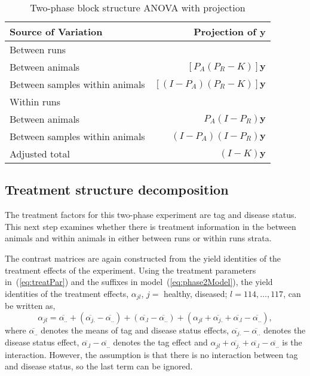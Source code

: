 \documentclass[article]{jss}
\begin{document}
\begin{table}[ht]
\centering
\caption{Two-phase block structure ANOVA with projection} 
\begin{tabular}[t]{lr}
\hline
\multicolumn{1}{l}{Source of Variation}  & \multicolumn{1}{r}{Projection of $\bm{y}$}\\
\hline
Between runs 					& \\
\hspace{3mm}Between animals & $[P_{A}(P_R - K)]\bm{y}$ 	\\
\hspace{3mm}Between samples within animals		& $[(I - P_{A})(P_R - K)]\bm{y}$ \\
\hline
Within runs 					& \\
\hspace{3mm}Between animals & $P_{A}(I-P_R)\bm{y}$\\
\hspace{3mm}Between samples within animals		&$(I - P_{A})(I-P_R)\bm{y}$ \\
\hline
Adjusted total  				&$(I-K)\bm{y}$  \\
\hline
\end{tabular}
\label{tab:block1Projection}
\end{table}

\subsection{Treatment structure decomposition}{\label{subsec:trtDecomp}}
The treatment factors for this two-phase experiment are tag and disease status. This next step examines whether there is treatment information in the between animals and within animals in either between runs or within runs strata.

The contrast matrices are again constructed from the yield identities of the treatment effects of the experiment. Using the treatment parameters in~(\ref{eq:treatPar}) and the suffixes in model~(\ref{eq:phase2Model}), the yield identities of the treatment effects, $\alpha_{jl}$, $j=$ healthy, diseased; $l = 114,\dots, 117$, can be written as,
\[
\alpha_{jl} = \overline{\alpha_{..}}+(\overline{\alpha_{j.}} -\overline{\alpha_{..}}) + (\overline{\alpha_{.l}} -\overline{\alpha_{..}}) +(\alpha_{jl} + \overline{\alpha_{j.}} + \overline{\alpha_{.l}} -\overline{\alpha_{..}}),
\]
where $\overline{\alpha_{..}}$ denotes the means of tag and disease status effects, $\overline{\alpha_{j.}} -\overline{\alpha_{..}}$ denotes the disease status effect, $\overline{\alpha_{.l}} -\overline{\alpha_{..}}$ denotes the tag effect and $\alpha_{jl} + \overline{\alpha_{j.}} + \overline{\alpha_{.l}} -\overline{\alpha_{..}}$ is the interaction. However, the assumption is that there is no interaction between tag and disease status, so the last term can be ignored.
\end{document}
